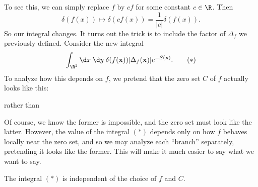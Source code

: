 \documentclass[a4paper]{article}
\begin{document}
To see this, we can simply replace $f$ by $cf$ for some constant $c \in \R$. Then
\[
  \delta(f(x)) \mapsto \delta(cf(x)) = \frac{1}{|c|} \delta(f(x)).
\]
So our integral changes. It turns out the trick is to include the factor of $\Delta_f$ we previously defined. Consider the new integral
\[
  \int_{\R^2}\d x\; \d y\; \delta(f(\mathbf{x})) |\Delta_f(\mathbf{x})| e^{-S(\mathbf{x})}.\tag{$*$}
\]
To analyze how this depends on $f$, we pretend that the zero set $C$ of $f$ actually looks like this:
\begin{center}
\end{center}
rather than
\begin{center}
\end{center}
Of course, we know the former is impossible, and the zero set must look like the latter. However, the value of the integral $(*)$ depends only on how $f$ behaves locally near the zero set, and so we may analyze each ``branch'' separately, pretending it looks like the former. This will make it much easier to say what we want to say.

\begin{thm}\leavevmode
  The integral $(*)$ is independent of the choice of $f$ and $C$.
\end{thm}
\end{document}
